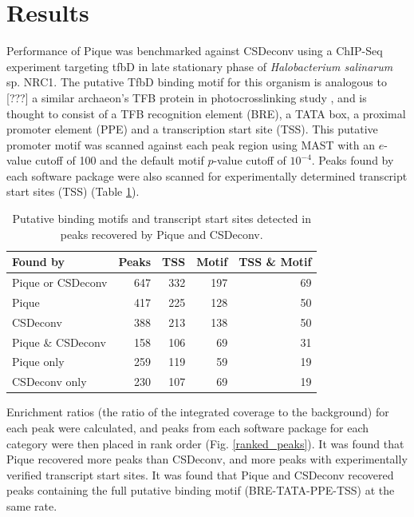 \documentclass{bioinfo}
\begin{document}
\section{Results}

Performance of Pique was benchmarked against CSDeconv using a ChIP-Seq
experiment targeting tfbD in late stationary phase of {\em
  Halobacterium salinarum} sp. NRC1. The putative TfbD binding motif
for this organism is analogous to [???] a similar archaeon's TFB
protein in photocrosslinking study \cite{tfb_promoter}, and is thought
to consist of a TFB recognition element (BRE), a TATA box, a proximal
promoter element (PPE) and a transcription start site (TSS). This
putative promoter motif was scanned against each peak region using
MAST \cite{MAST} with an $e$-value cutoff of 100 and the default motif
$p$-value cutoff of $10^{-4}$. Peaks found by each software package were
also scanned for experimentally determined transcript start sites
(TSS) \cite{halo_promoters} (Table \ref{table1}).

\begin{table}
  \begin{center}
    \begin{tabular}{l r r r r}
      Found by & Peaks & TSS & Motif & TSS \& Motif \\
      \hline
      Pique or CSDeconv & 647 & 332 & 197 & 69 \\
      Pique             & 417 & 225 & 128 & 50 \\
      CSDeconv          & 388 & 213 & 138 & 50 \\
      Pique \& CSDeconv & 158 & 106 & 69  & 31 \\
      Pique only        & 259 & 119 & 59  & 19 \\
      CSDeconv only     & 230 & 107 & 69  & 19 \\
    \end{tabular}
  \end{center}
  \caption{Putative binding motifs and transcript start sites detected 
    in peaks recovered by Pique and CSDeconv.}\label{table1}
\end{table}

Enrichment ratios (the ratio of the integrated coverage to the
background) for each peak were calculated, and peaks from each
software package for each category were then placed in rank order
(Fig. \ref{ranked_peaks}). It was found that Pique recovered more
peaks than CSDeconv, and more peaks with experimentally verified
transcript start sites. It was found that Pique and CSDeconv recovered
peaks containing the full putative binding motif (BRE-TATA-PPE-TSS) at
the same rate.
\end{document}
